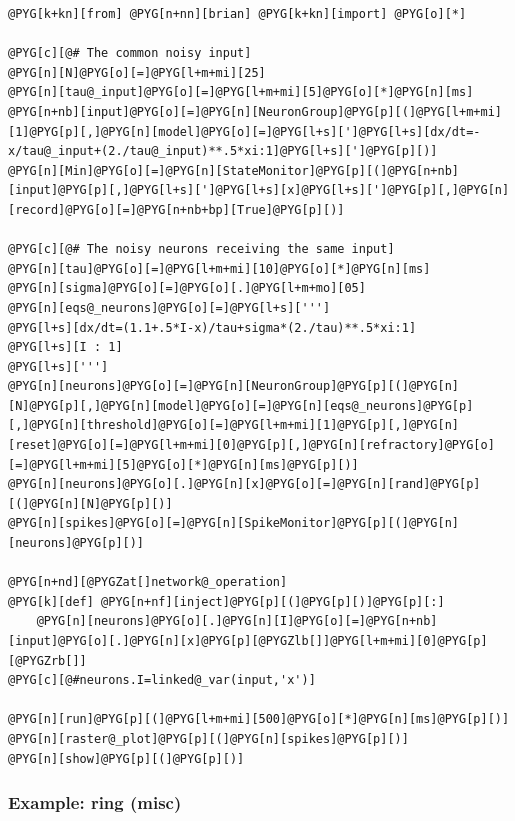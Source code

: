 \documentclass[letterpaper,10pt,english]{manual}
\begin{document}
\begin{Verbatim}[commandchars=@\[\]]
@PYG[k+kn][from] @PYG[n+nn][brian] @PYG[k+kn][import] @PYG[o][*]

@PYG[c][@# The common noisy input]
@PYG[n][N]@PYG[o][=]@PYG[l+m+mi][25]
@PYG[n][tau@_input]@PYG[o][=]@PYG[l+m+mi][5]@PYG[o][*]@PYG[n][ms]
@PYG[n+nb][input]@PYG[o][=]@PYG[n][NeuronGroup]@PYG[p][(]@PYG[l+m+mi][1]@PYG[p][,]@PYG[n][model]@PYG[o][=]@PYG[l+s][']@PYG[l+s][dx/dt=-x/tau@_input+(2./tau@_input)**.5*xi:1]@PYG[l+s][']@PYG[p][)]
@PYG[n][Min]@PYG[o][=]@PYG[n][StateMonitor]@PYG[p][(]@PYG[n+nb][input]@PYG[p][,]@PYG[l+s][']@PYG[l+s][x]@PYG[l+s][']@PYG[p][,]@PYG[n][record]@PYG[o][=]@PYG[n+nb+bp][True]@PYG[p][)]

@PYG[c][@# The noisy neurons receiving the same input]
@PYG[n][tau]@PYG[o][=]@PYG[l+m+mi][10]@PYG[o][*]@PYG[n][ms]
@PYG[n][sigma]@PYG[o][=]@PYG[o][.]@PYG[l+m+mo][05]
@PYG[n][eqs@_neurons]@PYG[o][=]@PYG[l+s][''']
@PYG[l+s][dx/dt=(1.1+.5*I-x)/tau+sigma*(2./tau)**.5*xi:1]
@PYG[l+s][I : 1]
@PYG[l+s][''']
@PYG[n][neurons]@PYG[o][=]@PYG[n][NeuronGroup]@PYG[p][(]@PYG[n][N]@PYG[p][,]@PYG[n][model]@PYG[o][=]@PYG[n][eqs@_neurons]@PYG[p][,]@PYG[n][threshold]@PYG[o][=]@PYG[l+m+mi][1]@PYG[p][,]@PYG[n][reset]@PYG[o][=]@PYG[l+m+mi][0]@PYG[p][,]@PYG[n][refractory]@PYG[o][=]@PYG[l+m+mi][5]@PYG[o][*]@PYG[n][ms]@PYG[p][)]
@PYG[n][neurons]@PYG[o][.]@PYG[n][x]@PYG[o][=]@PYG[n][rand]@PYG[p][(]@PYG[n][N]@PYG[p][)]
@PYG[n][spikes]@PYG[o][=]@PYG[n][SpikeMonitor]@PYG[p][(]@PYG[n][neurons]@PYG[p][)]

@PYG[n+nd][@PYGZat[]network@_operation]
@PYG[k][def] @PYG[n+nf][inject]@PYG[p][(]@PYG[p][)]@PYG[p][:]
    @PYG[n][neurons]@PYG[o][.]@PYG[n][I]@PYG[o][=]@PYG[n+nb][input]@PYG[o][.]@PYG[n][x]@PYG[p][@PYGZlb[]]@PYG[l+m+mi][0]@PYG[p][@PYGZrb[]]
@PYG[c][@#neurons.I=linked@_var(input,'x')]

@PYG[n][run]@PYG[p][(]@PYG[l+m+mi][500]@PYG[o][*]@PYG[n][ms]@PYG[p][)]
@PYG[n][raster@_plot]@PYG[p][(]@PYG[n][spikes]@PYG[p][)]
@PYG[n][show]@PYG[p][(]@PYG[p][)]
\end{Verbatim}

\resetcurrentobjects
\hypertarget{--doc-examples-misc_ring}{}

\hypertarget{index-66}{}\subsubsection{Example: ring (misc)}
\end{document}
